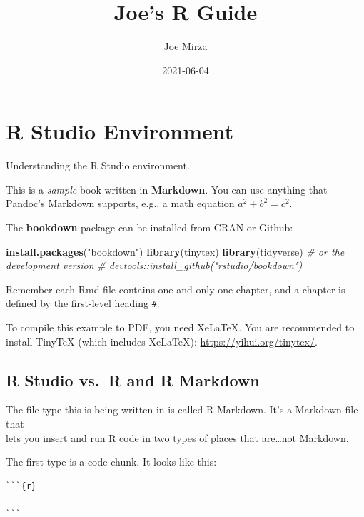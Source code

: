 \documentclass[
]{book}
\title{Joe's R Guide}
\author{Joe Mirza}
\date{2021-06-04}
\newenvironment{Shaded}{\begin{snugshade}}{\end{snugshade}}
\newcommand{\CommentTok}[1]{\textcolor[rgb]{0.56,0.35,0.01}{\textit{#1}}}
\newcommand{\KeywordTok}[1]{\textcolor[rgb]{0.13,0.29,0.53}{\textbf{#1}}}
\newcommand{\NormalTok}[1]{#1}
\newcommand{\StringTok}[1]{\textcolor[rgb]{0.31,0.60,0.02}{#1}}
\begin{document}
\maketitle

{
\setcounter{tocdepth}{1}
\tableofcontents
}
\hypertarget{r-studio-environment}{%
\chapter{R Studio Environment}\label{r-studio-environment}}

Understanding the R Studio environment.

This is a \emph{sample} book written in \textbf{Markdown}. You can use anything that Pandoc's Markdown supports, e.g., a math equation \(a^2 + b^2 = c^2\).

The \textbf{bookdown} package can be installed from CRAN or Github:

\begin{Shaded}
\begin{Highlighting}[]
\KeywordTok{install.packages}\NormalTok{(}\StringTok{"bookdown"}\NormalTok{)}
\KeywordTok{library}\NormalTok{(tinytex)}
\KeywordTok{library}\NormalTok{(tidyverse)}
\CommentTok{# or the development version}
\CommentTok{# devtools::install_github("rstudio/bookdown")}
\end{Highlighting}
\end{Shaded}

Remember each Rmd file contains one and only one chapter, and a chapter is defined by the first-level heading \texttt{\#}.

To compile this example to PDF, you need XeLaTeX. You are recommended to install TinyTeX (which includes XeLaTeX): \url{https://yihui.org/tinytex/}.

\hypertarget{r-studio-vs.-r-and-r-markdown}{%
\section{R Studio vs.~R and R Markdown}\label{r-studio-vs.-r-and-r-markdown}}

The file type this is being written in is called R Markdown. It's a Markdown file that\\
lets you insert and run R code in two types of places that are\ldots not Markdown.

The first type is a code chunk. It looks like this:

\begin{verbatim}
```{r}

```
\end{verbatim}
\end{document}
